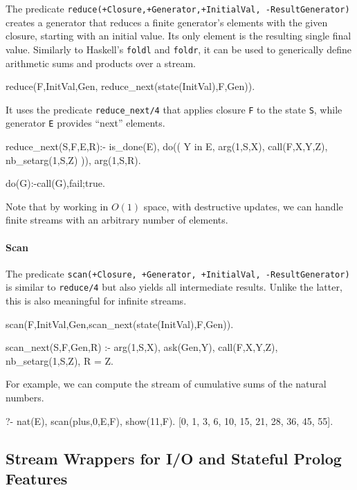 \documentclass{new_tlp}
\begin{document}
The predicate {\tt reduce(+Closure,+Generator,+InitialVal, -ResultGenerator)}
creates a generator that reduces a finite generator's elements with the given closure, 
starting with an initial value. Its only element is the resulting single final value.
Similarly to Haskell's {\tt foldl} and {\tt foldr}, it can be used to
generically define arithmetic sums and products over a stream.

\begin{code}
reduce(F,InitVal,Gen, reduce_next(state(InitVal),F,Gen)).
\end{code}
It uses the predicate {\tt reduce\_next/4} 
that  applies closure {\tt F} to the state {\tt S}, 
while generator {\tt E} provides ``next'' elements.
\begin{code}
reduce_next(S,F,E,R):- \+ is_done(E),
  do((
    Y in E, arg(1,S,X),
    call(F,X,Y,Z),
    nb_setarg(1,S,Z)
  )),
  arg(1,S,R).

do(G):-call(G),fail;true.
\end{code}
Note that by working in $O(1)$ space, with destructive updates,
we can handle finite streams with an arbitrary number of elements.

\paragraph{Scan}

The predicate {\tt scan(+Closure, +Generator, +InitialVal, -ResultGenerator)} is
similar to \texttt{reduce/4} but also yields all intermediate results. Unlike the latter, this is
also meaningful for infinite streams.
\begin{code}
scan(F,InitVal,Gen,scan_next(state(InitVal),F,Gen)).

scan_next(S,F,Gen,R) :-
  arg(1,S,X),
  ask(Gen,Y),
  call(F,X,Y,Z),
  nb_setarg(1,S,Z),
  R = Z.
\end{code}
For example, we can compute the stream of cumulative sums of the natural numbers.
\begin{codex}
?- nat(E), scan(plus,0,E,F), show(11,F).
[0, 1, 3, 6, 10, 15, 21, 28, 36, 45, 55].
\end{codex}

\subsection{Stream Wrappers for I/O and Stateful Prolog Features}
\end{document}
